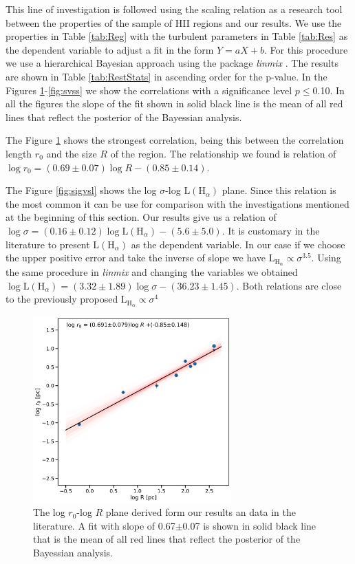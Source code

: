 \documentclass[fleqn,usenatbib, useAMS, a4paper]{mnras}
\begin{document}
This line of investigation is followed using the scaling relation as a research tool between the properties of the sample of HII regions and our results. 
We use the properties in Table \ref{tab:Reg} with the turbulent parameters in Table \ref{tab:Res} as the dependent variable to adjust a fit in the form $Y = aX +b$. 
For this procedure we use a hierarchical Bayesian approach using the package \textit{linmix} \citep{2007ApJ...665.1489K}.
The results are shown in Table \ref{tab:RestStats} in ascending order for the p-value.
In the Figures \ref{fig:rvsR}-\ref{fig:svss} we show the correlations with a significance level  $p \leq $0.10.
In all the figures the slope of the fit shown in solid black line is the mean of all red lines that reflect the posterior of the Bayessian analysis.

The Figure \ref{fig:rvsR} shows the strongest correlation, being this between the correlation length $r_0$ and the size $R$ of the region. The relationship we found is relation of $\log r_0 = (0.69 \pm 0.07) \log R-(0.85 \pm 0.14)$.

The Figure \ref{fig:sigvsl} shows the log $\sigma$-log $\text{L}(\text{H}_{\alpha})$ plane.
Since this relation is the most common it can be use for comparison with the investigations mentioned at the beginning of this section.
Our results give us a relation of $\log \sigma = (0.16 \pm 0.12) \log \text{L}(\text{H}_{\alpha})-(5.6 \pm 5.0)$.
It is customary in the literature to present $\text{L} (\text{H}_{\alpha})$ as the dependent variable.
In our case if we choose the upper positive error and take the inverse of slope we have \(\text{L}_{\text{H}_{\alpha}} \propto \sigma^{3.5}\). 
Using the same procedure in \textit{linmix} and changing the variables we obtained $\log \text{L}(\text{H}_{\alpha}) = (3.32\pm 1.89) \log \sigma -(36.23 \pm 1.45)$.
Both relations are close to the previously proposed \(\text{L}_{\text{H}_{\alpha}} \propto \sigma^{4}\)




\begin{figure}
\centering 
\includegraphics[width=3in]{Figures/rvsR}
\caption{The log $r_0$-log $R$ plane derived form our results an data in the literature. A fit with slope of 0.67$\pm$0.07 is shown in solid black line that is the mean of all red lines that reflect the posterior of the Bayessian analysis. }
\label{fig:rvsR}
\end{figure}
\end{document}
